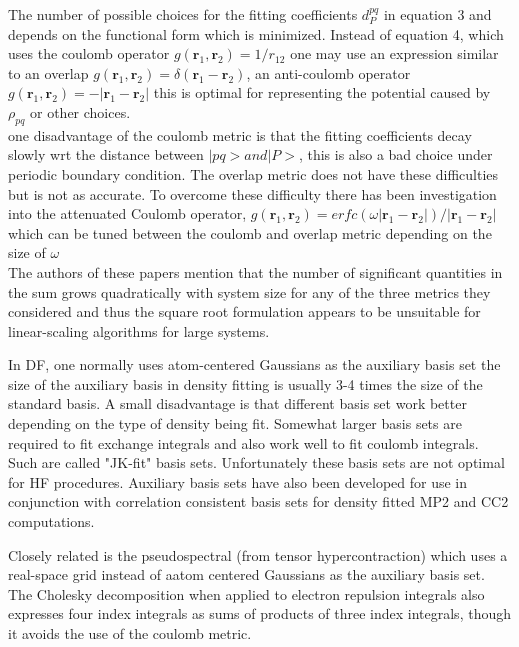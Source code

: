 \documentclass[10pt, draft]{article}
\begin{document}
	The number of possible choices for the fitting coefficients $d_P^{pq}$ in equation 3 and depends on the functional form which is minimized.  Instead of equation 4, which uses the coulomb operator $g(\textbf{r}_1,\textbf{r}_2) = 1/r_{12}$ one may use an expression similar to an overlap $g(\textbf{r}_1,\textbf{r}_2) = \delta(\textbf{r}_1-\textbf{r}_2)$, an anti-coulomb operator $g(\textbf{r}_1,\textbf{r}_2) = -|\textbf{r}_1-\textbf{r}_2|$ this is optimal for representing the potential caused by $\rho_{pq}$ or other choices.\\
	one disadvantage of the coulomb metric is that the fitting coefficients decay slowly wrt the distance between $|pq> and |P>$, this is also a bad choice under periodic boundary condition.  The overlap metric does not have these difficulties but is not as accurate.  To overcome these difficulty there has been investigation into the attenuated Coulomb operator, $g(\textbf{r}_1, \textbf{r}_2) = erfc(\omega | \textbf{r}_1-\textbf{r}_2|)/|\textbf{r}_1-\textbf{r}_2|$ which can be tuned between the coulomb and overlap metric depending on the size of $\omega$ \\The authors of these papers mention that the number of significant quantities in the sum grows quadratically with system size for any of the three metrics they considered and thus the square root formulation appears to be unsuitable for linear-scaling algorithms for large systems.\linebreak[1]
	
	In DF, one normally uses atom-centered Gaussians as the auxiliary basis set the size of the auxiliary basis in density fitting is usually 3-4 times the size of the standard basis.  A small disadvantage is that different basis set work better depending on the type of density being fit.  Somewhat larger basis sets are required to fit exchange integrals and also work well to fit coulomb integrals.  Such are called "JK-fit" basis sets.  Unfortunately these basis sets are not optimal for HF procedures.  Auxiliary basis sets have also been developed for use in conjunction with correlation consistent basis sets for density fitted MP2 and CC2 computations.  \linebreak[1]
	
	Closely related is the pseudospectral (from tensor hypercontraction) which uses a real-space grid instead of aatom centered Gaussians as the auxiliary basis set.  The Cholesky decomposition when applied to electron repulsion integrals also expresses four index integrals as sums of products of three index integrals, though it avoids the use of the coulomb metric.\linebreak[1]
	
\end{document}
